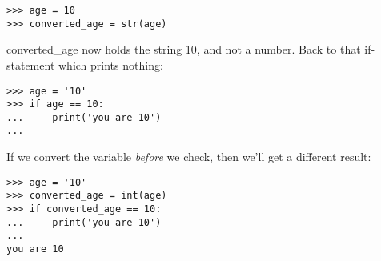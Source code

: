 \begin{listing}
\begin{verbatim}
>>> age = 10
>>> converted_age = str(age)
\end{verbatim}
\end{listing}

\noindent
converted\_age now holds the string 10, and not a number. Back to that if-statement which prints nothing:

\begin{listing}
\begin{verbatim}
>>> age = '10'
>>> if age == 10:
...     print('you are 10')
...
\end{verbatim}
\end{listing}

\noindent
If we convert the variable \emph{before} we check, then we'll get a different result:

\begin{listing}
\begin{verbatim}
>>> age = '10'
>>> converted_age = int(age)
>>> if converted_age == 10:
...     print('you are 10')
...
you are 10
\end{verbatim}
\end{listing}

\newpage